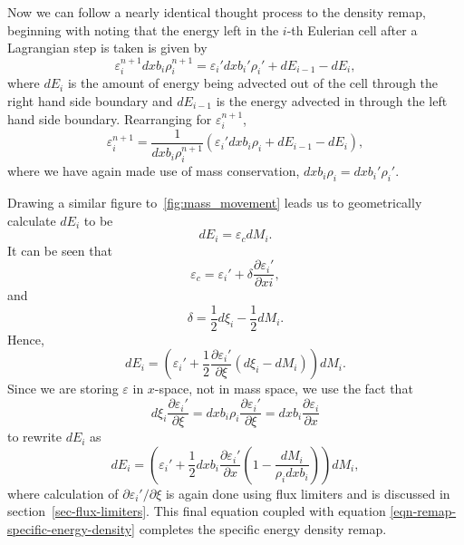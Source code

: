 Now we can follow a nearly identical thought process to the density remap, beginning with noting that the energy left in the $i$-th Eulerian cell after a Lagrangian step is taken is given by
\begin{equation}
  \varepsilon_i^{n+1} dxb_i \rho_i^{n+1} = \varepsilon_i' dxb_i' \rho_i' + dE_{i-1} - dE_i,
\end{equation}
where $dE_i$ is the amount of energy being advected out of the cell through the right hand side boundary and $dE_{i-1}$ is the energy advected in through the left hand side boundary. Rearranging for $\varepsilon_i^{n+1}$, 
\begin{equation}
  \varepsilon_i^{n+1}  = \frac{1}{dxb_i \rho_i^{n+1}}(\varepsilon_i' dxb_i \rho_i + dE_{i-1} - dE_i),
  \label{eqn-remap-specific-energy-density}
\end{equation}
where we have again made use of mass conservation, $dxb_i \rho_i = dxb_i' \rho_i'$.

Drawing a similar figure to~\ref{fig:mass_movement} leads us to geometrically calculate $dE_i$ to be
\begin{equation}
  dE_i = \varepsilon_c dM_i.
\end{equation}
It can be seen that
\begin{equation}
  \varepsilon_c = \varepsilon_i' + \delta \frac{\partial \varepsilon_i'}{\partial xi},
\end{equation}
and
\begin{equation}
  \delta = \frac{1}{2}d\xi_i - \frac{1}{2}dM_i.
\end{equation}
Hence, 
\begin{equation}
  dE_i = \left( \varepsilon_i' + \frac{1}{2}\frac{\partial \varepsilon_i'}{\partial \xi} (d\xi_i - dM_i) \right)dM_i.
\end{equation}
Since we are storing $\varepsilon$ in $x$-space, not in mass space, we use the fact that
\begin{equation}
  d\xi_i \frac{\partial \varepsilon_i'}{\partial \xi} = dxb_i\rho_i \frac{\partial \varepsilon_i'}{\partial \xi} = dxb_i \frac{\partial \varepsilon_i}{\partial x}
\end{equation}
to rewrite $dE_i$ as
\begin{equation}
  dE_i = \left( \varepsilon_i' + \frac{1}{2}dxb_i\frac{\partial \varepsilon_i'}{\partial x} \left( 1 - \frac{dM_i}{\rho_i dxb_i} \right) \right)dM_i,
  \label{eqn-remap-energy-difference}
\end{equation}
where calculation of $\partial \varepsilon_i'/\partial\xi$ is again done using flux limiters and is discussed in section~\ref{sec-flux-limiters}. This final equation coupled with equation \eqref{eqn-remap-specific-energy-density} completes the specific energy density remap.

